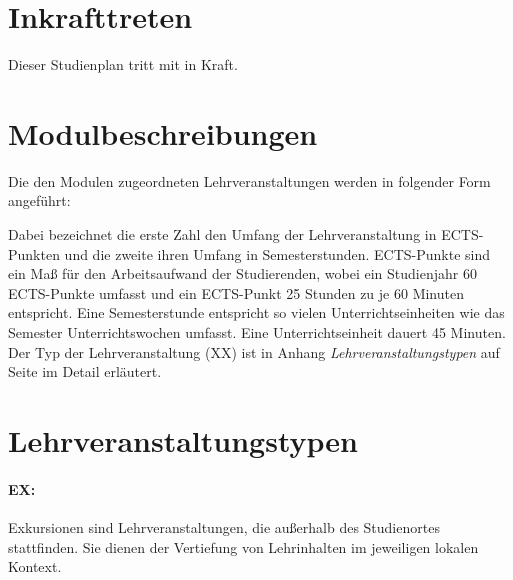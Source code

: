 %

\section{Inkrafttreten}\label{sec:IK}

Dieser Studienplan tritt mit  in Kraft.

%

\appendix
\section{Modulbeschreibungen}\label{app:AMB}

Die den Modulen zugeordneten Lehrveranstaltungen werden in folgender
Form angeführt:

\noindent
Dabei bezeichnet die erste Zahl den Umfang der
Lehrveranstaltung in ECTS-Punkten und die zweite ihren Umfang in
Semesterstunden. ECTS-Punkte sind ein Maß für den Arbeitsaufwand der
Studierenden, wobei ein Studienjahr 60 ECTS-Punkte umfasst und ein
ECTS-Punkt 25 Stunden zu je 60 Minuten entspricht. Eine Semesterstunde 
entspricht so vielen Unterrichtseinheiten wie das Semester 
Unterrichtswochen umfasst. Eine Unterrichtseinheit dauert 45 Minuten. 
Der Typ der Lehrveranstaltung (XX) ist in Anhang \emph{Lehrveranstaltungstypen} 
auf Seite \pageref{app:ALT} im Detail erläutert.

%

\section{Lehrveranstaltungstypen}\label{app:ALT}

\paragraph{EX:} Exkursionen sind Lehrveranstaltungen, die außerhalb
des Studienortes stattfinden. Sie dienen der Vertiefung von
Lehrinhalten im jeweiligen lokalen Kontext.

